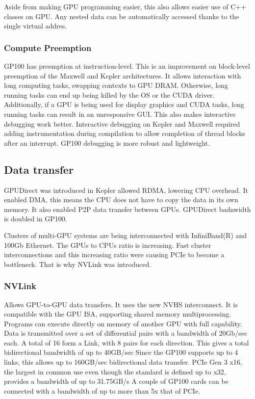 Aside from making GPU programming easier, this also allows easier use of C++ classes on GPU.
Any nested data can be automatically accessed thanks to the single virtual addres.

\subsubsection{Compute Preemption}
GP100 has preemption at instruction-level.
This is an improvement on block-level preemption of the Maxwell and Kepler architectures.
It allows interaction with long computing tasks, swapping contexts to GPU DRAM.
Otherwise, long running tasks can end up being killed by the OS or the CUDA driver.
Additionally, if a GPU is being used for display graphics and CUDA tasks, long running tasks can result in an unresponsive GUI.
This also makes interactive debugging work better.
Interactive debugging on Kepler and Maxwell required adding instrumentation during compilation to allow completion of thread blocks after an interrupt.
GP100 debugging is more robust and lightweight.


\subsection{Data transfer}
GPUDirect was introduced in Kepler allowed RDMA, lowering CPU overhead.
It enabled DMA, this means the CPU does not have to copy the data in its own memory.
It also enabled P2P data transfer between GPUs.
GPUDirect badnwidth is doubled in GP100.

Clusters of multi-GPU systems are being interconnected with InfiniBand(R) and 100Gb Ethernet.
The GPUs to CPUs ratio is increasing.
Fast cluster interconnections and this increasing ratio were causing PCIe to become a bottleneck.
That is why NVLink was introduced.
\subsubsection{NVLink}
Allows GPU-to-GPU data transfers.
It uses the new NVHS interconnect.
It is compatible with the GPU ISA, supporting shared memory multiprocessing.
Programs can execute directly on memory of another GPU with full capability.
Data is transmitted over a set of differential pairs with a bandwidth of 20Gb/sec each.
A total of 16 form a Link, with 8 pairs for each direction.
This gives a total bidirectional bandwidth of up to 40GB/sec
Since the GP100 supports up to 4 links, this allows up to 160GB/sec bidirectional data transfer.
PCIe Gen 3 x16, the largest in common use even though the standard is defined up to x32, provides a bandwidth of up to 31.75GB/s
A couple of GP100 cards can be connected with a bandwidth of up to more than 5x that of PCIe.

